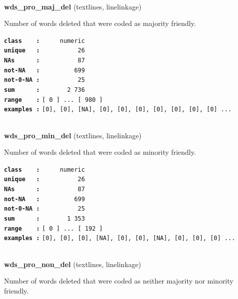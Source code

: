 \documentclass[]{article}
\begin{document}
~

\textbf{wds\_pro\_maj\_del} (textlines, linelinkage)

Number of words deleted that were coded as majority friendly.

\textbf{\texttt{class\ \ \ \ :}} \texttt{~~~~~numeric}\\
\textbf{\texttt{unique\ \ \ :}} \texttt{~~~~~~~~~~26}\\
\textbf{\texttt{NAs\ \ \ \ \ \ :}} \texttt{~~~~~~~~~~87}\\
\textbf{\texttt{not-NA\ \ \ :}} \texttt{~~~~~~~~~699}\\
\textbf{\texttt{not-0-NA\ :}} \texttt{~~~~~~~~~~25}\\
\textbf{\texttt{sum\ \ \ \ \ \ :}} \texttt{~~~~~~~2~736}\\
\textbf{\texttt{range\ \ \ \ :}}
\texttt{{[}\ 0\ {]}\ ...\ {[}\ 980\ {]}}\\
\textbf{\texttt{examples\ :}}
\texttt{{[}0{]},\ {[}0{]},\ {[}NA{]},\ {[}0{]},\ {[}0{]},\ {[}0{]},\ {[}0{]},\ {[}0{]},\ {[}0{]},\ {[}0{]}\ ...}\\

~

\textbf{wds\_pro\_min\_del} (textlines, linelinkage)

Number of words deleted that were coded as minority friendly.

\textbf{\texttt{class\ \ \ \ :}} \texttt{~~~~~numeric}\\
\textbf{\texttt{unique\ \ \ :}} \texttt{~~~~~~~~~~26}\\
\textbf{\texttt{NAs\ \ \ \ \ \ :}} \texttt{~~~~~~~~~~87}\\
\textbf{\texttt{not-NA\ \ \ :}} \texttt{~~~~~~~~~699}\\
\textbf{\texttt{not-0-NA\ :}} \texttt{~~~~~~~~~~25}\\
\textbf{\texttt{sum\ \ \ \ \ \ :}} \texttt{~~~~~~~1~353}\\
\textbf{\texttt{range\ \ \ \ :}}
\texttt{{[}\ 0\ {]}\ ...\ {[}\ 192\ {]}}\\
\textbf{\texttt{examples\ :}}
\texttt{{[}0{]},\ {[}0{]},\ {[}0{]},\ {[}NA{]},\ {[}0{]},\ {[}0{]},\ {[}NA{]},\ {[}0{]},\ {[}0{]},\ {[}0{]}\ ...}\\

~

\textbf{wds\_pro\_non\_del} (textlines, linelinkage)

Number of words deleted that were coded as neither majority nor minority
friendly.
\end{document}
